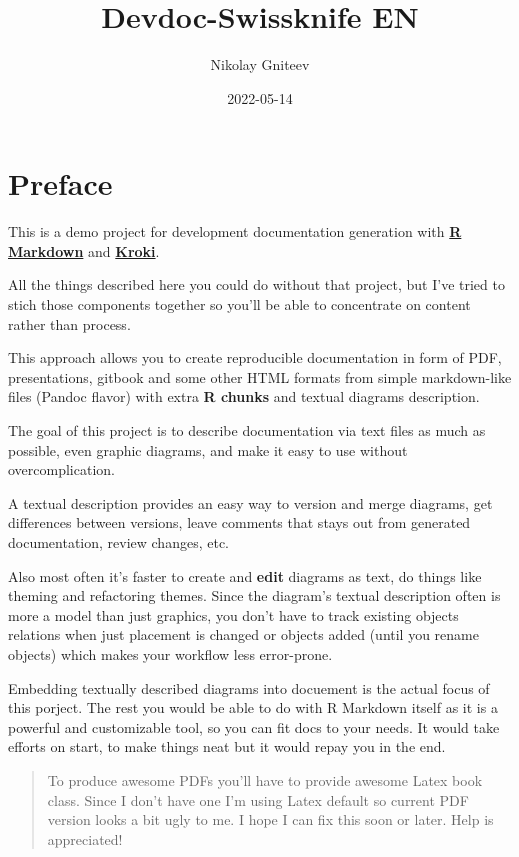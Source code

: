 \documentclass[
  12pt,
  a4paper,
  12pt,
  oneside,
  openany]{book}
\title{Devdoc-Swissknife EN}
\author{Nikolay Gniteev}
\date{2022-05-14}
\begin{document}
\maketitle

{
\hypersetup{linkcolor=}
\setcounter{tocdepth}{2}
\tableofcontents
}
\listoftables
\listoffigures
\hypertarget{intro}{%
\chapter*{Preface}\label{intro}}


This is a demo project for development documentation generation with \href{https://rmarkdown.rstudio.com/}{\textbf{R Markdown}} and \href{https://kroki.io/}{\textbf{Kroki}}.

All the things described here you could do without that project, but I've tried to stich those components together so you'll be able to concentrate on content rather than process.

This approach allows you to create reproducible documentation in form of PDF, presentations, gitbook and some other HTML formats from simple markdown-like files (Pandoc flavor) with extra \textbf{R chunks} and textual diagrams description.

The goal of this project is to describe documentation via text files as much as possible, even graphic diagrams, and make it easy to use without overcomplication.

A textual description provides an easy way to version and merge diagrams, get differences between versions, leave comments that stays out from generated documentation, review changes, etc.

Also most often it's faster to create and \textbf{edit} diagrams as text, do things like theming and refactoring themes. Since the diagram's textual description often is more a model than just graphics, you don't have to track existing objects relations when just placement is changed or objects added (until you rename objects) which makes your workflow less error-prone.

Embedding textually described diagrams into docuement is the actual focus of this porject. The rest you would be able to do with R Markdown itself as it is a powerful and customizable tool, so you can fit docs to your needs. It would take efforts on start, to make things neat but it would repay you in the end.

\begin{quote}
To produce awesome PDFs you'll have to provide awesome Latex book class. Since I don't have one I'm using Latex default so current PDF version looks a bit ugly to me. I hope I can fix this soon or later. Help is appreciated!
\end{quote}
\end{document}
